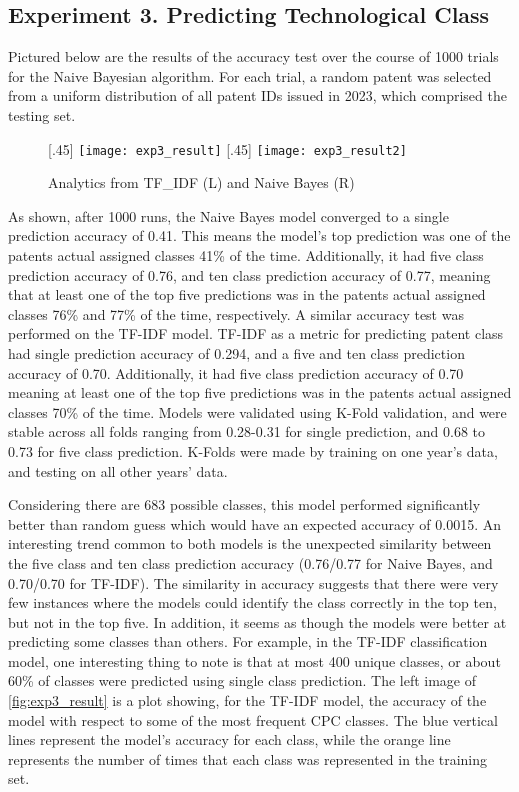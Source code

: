 \documentclass{article}
\begin{document}
\subsection{Experiment 3. Predicting Technological Class}
Pictured below are the results of the accuracy test over the course of 1000 trials for the Naive Bayesian algorithm.  For each trial, a random patent was selected from a uniform distribution of all patent IDs issued in 2023, which comprised the testing set.

\begin{figure}[ht]
  [.45\linewidth]{%
    \texttt{[image: exp3\_result]}%
  }%
  \hfill
  [.45\linewidth]{%
    \texttt{[image: exp3\_result2]}%
  }
  \caption{Analytics from TF\_IDF (L) and Naive Bayes (R)}
  \label{fig:exp3_result}
\end{figure}


As shown, after 1000 runs, the Naive Bayes model converged to a single prediction accuracy of 0.41.  This means the model’s top prediction was one of the patents actual assigned classes 41\% of the time. Additionally, it had five class prediction accuracy of 0.76, and ten class prediction accuracy of 0.77, meaning that at least one of the top five predictions was in the patents actual assigned classes 76\% and 77\% of the time, respectively.  A similar accuracy test was performed on the TF-IDF model.  TF-IDF as a metric for predicting patent class had single prediction accuracy of 0.294, and a five and ten class prediction accuracy of 0.70. Additionally, it had five class prediction accuracy of 0.70 meaning at least one of the top five predictions was in the patents actual assigned classes 70\% of the time. Models were validated using K-Fold validation, and were stable across all folds ranging from 0.28-0.31 for single prediction, and 0.68 to 0.73 for five class prediction. K-Folds were made by training on one year's data, and testing on all other years' data. 

Considering there are 683 possible classes, this model performed significantly better than random guess which would have an expected accuracy of 0.0015. An interesting trend common to both models is the unexpected similarity between the five class and ten class prediction accuracy (0.76/0.77 for Naive Bayes, and 0.70/0.70 for TF-IDF).  The similarity in accuracy suggests that there were very few instances where the models could identify the class correctly in the top ten, but not in the top five. In addition, it seems as though the models were better at predicting some classes than others.   For example, in the TF-IDF classification model, one interesting thing to note is that at most 400 unique classes, or about 60\% of classes were predicted using single class prediction. The left image of \autoref{fig:exp3_result} is a plot showing, for the TF-IDF model, the accuracy of the model with respect to some of the most frequent CPC classes.  The blue vertical lines represent the model’s accuracy for each class, while the orange line represents the number of times that each class was represented in the training set. 
\end{document}
